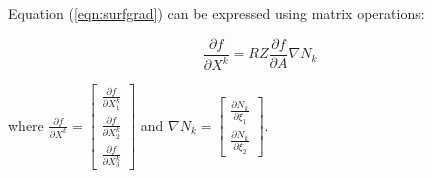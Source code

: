 \noindent Equation (\ref{eqn:surfgrad}) can be expressed using matrix operations:

\begin{equation}
\frac{\partial f}{\partial X^k} = R Z \frac{\partial f}{\partial A} \nabla N_k
\end{equation}

where $\frac{\partial f}{\partial X^k} = \left[ \begin{array}{c} 
\frac{\partial f}{\partial X^k_1} \\
\frac{\partial f}{\partial X^k_2} \\
\frac{\partial f}{\partial X^k_3} \end{array} \right]$
and $\nabla N_k = \left[ \begin{array}{c} 
\frac{\partial N_k}{\partial \xi_1} \\
\frac{\partial N_k}{\partial \xi_2} \end{array} \right]$.


